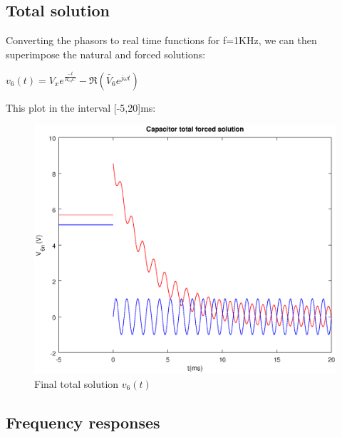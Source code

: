   

\subsection{Total solution}

Converting the phasors to real time functions for f=1KHz, we can then superimpose the natural and forced solutions:

$v_6(t)=V_xe^{\frac{-t}{R_{eq}C}}-\Re(\tilde{V_6}e^{j\omega t})$


  This plot in the interval [-5,20]ms:

  \begin{figure}[H] \centering
    \includegraphics[width=1\linewidth]{forced.eps}
    \caption{Final total solution $v_{6}(t)$}
    \label{fig:total}
    \end{figure}
    
\subsection{Frequency responses}
      
